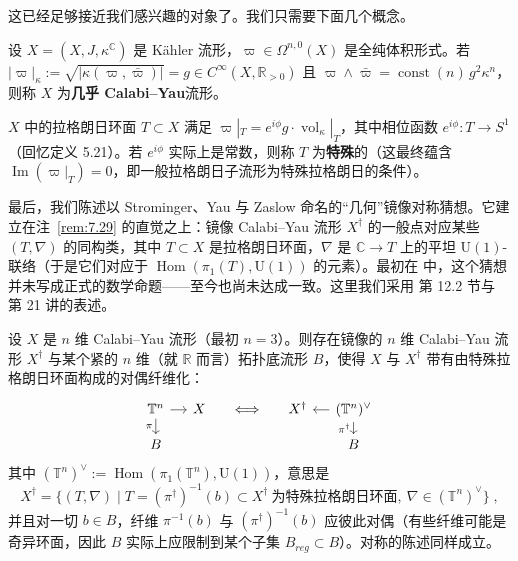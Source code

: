这已经足够接近我们感兴趣的对象了。我们只需要下面几个概念。

\begin{Def}\label{def:7.30}
设 $X=(X,J,\kappa^{\mathbb C})$ 是 Kähler 流形，$\varpi\in\Omega^{n,0}(X)$ 是全纯体积形式。若 $|\varpi|_\kappa:=\sqrt{|\kappa(\varpi,\bar\varpi)|}=g\in C^\infty(X,\mathbb R_{>0})$ 且 $\varpi\wedge\bar\varpi=\operatorname{const}(n)\,g^2\kappa^n$，则称 $X$ 为\textbf{几乎 Calabi–Yau}流形。
\end{Def}

$X$ 中的拉格朗日环面 $T\subset X$ 满足 $\varpi|_T=e^{i\phi}g\cdot\operatorname{vol}_\kappa|_T$，其中相位函数 $e^{i\phi}:T\to S^1$（回忆定义 5.21）。若 $e^{i\phi}$ 实际上是常数，则称 $T$ 为\textbf{特殊}的（这最终蕴含 $\operatorname{Im}(\varpi|_T)=0$，即一般拉格朗日子流形为特殊拉格朗日的条件）。

最后，我们陈述以 Strominger、Yau 与 Zaslow 命名的“几何”镜像对称猜想。它建立在注~\ref{rem:7.29} 的直觉之上：镜像 Calabi–Yau 流形 $X^\dagger$ 的一般点对应某些 $(T,\nabla)$ 的同构类，其中 $T\subset X$ 是拉格朗日环面，$\nabla$ 是 $\mathbb C\to T$ 上的平坦 $\mathrm U(1)$-联络（于是它们对应于 $\operatorname{Hom}(\pi_1(T),\mathrm U(1))$ 的元素）。最初在 \cite{SYZ96} 中，这个猜想并未写成正式的数学命题——至今也尚未达成一致。这里我们采用 \cite{GHJ03} 第 12.2 节与 \cite{Aur09} 第 21 讲的表述。

\begin{Con}[SYZ 猜想]\label{con:7.31}
设 $X$ 是 $n$ 维 Calabi–Yau 流形（最初 $n=3$）。则存在镜像的 $n$ 维 Calabi–Yau 流形 $X^\dagger$ 与某个紧的 $n$ 维（就 $\mathbb R$ 而言）拓扑底流形 $B$，使得 $X$ 与 $X^\dagger$ 带有由特殊拉格朗日环面构成的对偶纤维化：
\begin{equation}\label{eq:7.119}
\begin{tikzcd}[column sep=small, row sep=small]
\mathbb T^n \arrow[r] \arrow[d, "\pi"'] & X & \Longleftrightarrow & X^\dagger & (\mathbb T^n)^\vee \arrow[l] \arrow[d, "\pi^\dagger"'] \\
B & & & & B
\end{tikzcd}
\end{equation}
其中 $(\mathbb T^n)^\vee:=\operatorname{Hom}(\pi_1(\mathbb T^n),\mathrm U(1))$，意思是
\begin{equation}\label{eq:7.120}
X^\dagger=\{(T,\nabla)\mid T=(\pi^\dagger)^{-1}(b)\subset X^\dagger\ \text{为特殊拉格朗日环面},\ \nabla\in(\mathbb T^n)^\vee\}\;,
\end{equation}
并且对一切 $b\in B$，纤维 $\pi^{-1}(b)$ 与 $(\pi^\dagger)^{-1}(b)$ 应彼此对偶（有些纤维可能是奇异环面，因此 $B$ 实际上应限制到某个子集 $B_{reg}\subset B$）。对称的陈述同样成立。
\end{Con}

